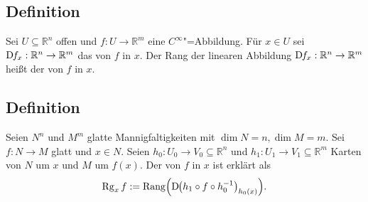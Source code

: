 \subsection[Definition: Rang des Differentials einer $C^\infty$"=Abbildung $f : \mathds{R}^m \to \mathds{R}^n$]{Definition} %
\label{sub:162}
Sei $U \subseteq \mathds{R}^n$ offen und $f : U\to \mathds{R}^m$ eine $C^\infty$"=Abbildung. Für $x \in U$ sei $\mathrm{D}\mkern-1.5mu f_x : \mathbb{R}^n \to \mathbb{R}^m$ das 
 von $f$ in $x$. Der Rang der linearen Abbildung $\mathrm{D}\mkern-1.5mu f_x : \mathbb{R}^n \to \mathbb{R}^m$ heißt der  von $f$ in $x$. 

\subsection[Definition: Rang einer $C^\infty$"=Abbildung $f : N \to M$]{Definition} %
\label{sub:163}
Seien $N^n$ und $M^m$ glatte Mannigfaltigkeiten mit $\dim N = n, \dim M =m$. Sei $f : N \to M$ glatt und $x \in N$. Seien $h_0 : U_0 \to V_0 \subseteq \mathds{R}^n$ und
$h_1 : U_1 \to V_1 \subseteq \mathds{R}^m$ Karten von $N$ um $x$ und $M$ um $f(x)$. Der  von $f$ in $x$ ist erklärt als 
\[
	\Rg_x f := \mathrm{Rang} \enbrace[\Big]{\D \enbrace*{h_1 \circ f \circ h_0 ^{-1}}_{h_0(x)}} .
\]
